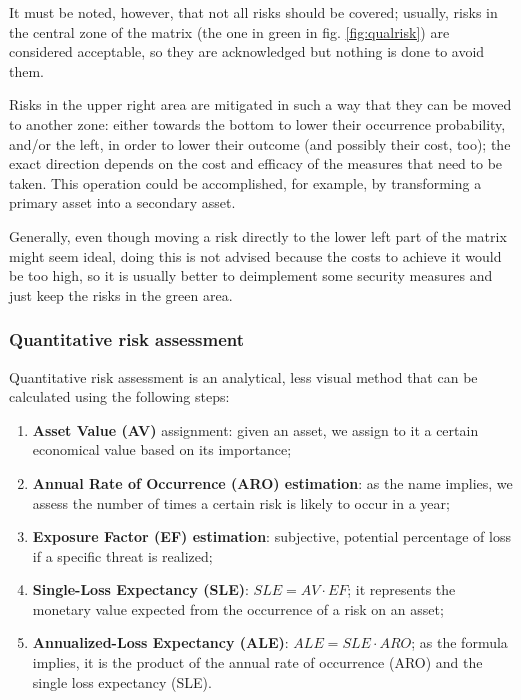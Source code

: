 It must be noted, however, that not all risks should be covered; usually, risks in the central zone of the matrix (the one in green in fig. \ref{fig:qualrisk}) are considered acceptable, so they are acknowledged but nothing is done to avoid them.

Risks in the upper right area are mitigated in such a way that they can be moved to another zone: either towards the bottom to lower their occurrence probability, and/or the left, in order to lower their outcome (and possibly their cost, too); the exact direction depends on the cost and efficacy of the measures that need to be taken. This operation could be accomplished, for example, by transforming a primary asset into a secondary asset.

Generally, even though moving a risk directly to the lower left part of the matrix might seem ideal, doing this is not advised because the costs to achieve it would be too high, so it is usually better to deimplement some security measures and just keep the risks in the green area.


\subsubsection{Quantitative risk assessment}
Quantitative risk assessment is an analytical, less visual method that can be calculated using the following steps:

\begin{enumerate}
    \item \textbf{Asset Value (AV)} assignment: given an asset, we assign to it a certain economical value based on its importance;
    \item \textbf{Annual Rate of Occurrence (ARO) estimation}: as the name implies, we assess the number of times a certain risk is likely to occur in a year;
    \item \textbf{Exposure Factor (EF) estimation}: subjective, potential percentage of loss if a specific threat is realized;
    \item \textbf{Single-Loss Expectancy (SLE)}: $SLE = AV \cdot EF$; it represents the monetary value expected from the occurrence of a risk on an asset;
    \item \textbf{Annualized-Loss Expectancy (ALE)}: $ALE = SLE \cdot ARO$; as the formula implies, it is the product of the annual rate of occurrence (ARO) and the single loss expectancy (SLE).
\end{enumerate}


